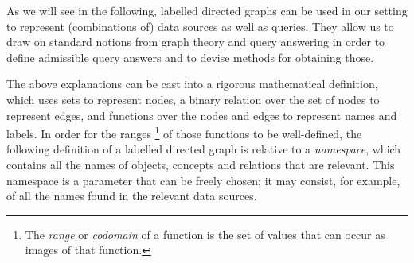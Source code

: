 As we will see in the following, labelled directed graphs can be used in our setting
to represent (combinations of) data sources as well as queries.
They allow us to draw on standard notions from graph theory and query answering
in order to define admissible query answers and to devise methods for obtaining those.


The above explanations can be cast into a rigorous mathematical definition,
which uses sets to represent nodes, a binary relation over the set of nodes
to represent edges, and functions over the nodes and edges to represent
names and labels. In order for the ranges%
\footnote{The \emph{range} or \emph{codomain} of a function is the set of values that can occur as images of that function.}
of those functions to be well-defined,
the following definition of a labelled directed graph is relative to a \emph{namespace},
which contains all the names of objects, concepts and relations that are relevant.
This namespace is a parameter that can be freely chosen; it may consist,
for example, of all the names found in the relevant data sources.
%
